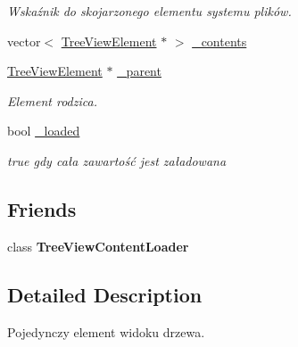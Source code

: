 \begin{DoxyCompactItemize}
\begin{DoxyCompactList}\small\item\em Wskaźnik do skojarzonego elementu systemu plików. \item\end{DoxyCompactList}\item 
vector$<$ \hyperlink{class_tree_view_element}{TreeViewElement} $\ast$ $>$ \hyperlink{class_tree_view_element_aa617b10a5c826119ed53c84bb829aaf5}{\_\-contents}
\item 
\hypertarget{class_tree_view_element_aebc63a226e57b45a351427d51d95552f}{
\hyperlink{class_tree_view_element}{TreeViewElement} $\ast$ \hyperlink{class_tree_view_element_aebc63a226e57b45a351427d51d95552f}{\_\-parent}}
\label{class_tree_view_element_aebc63a226e57b45a351427d51d95552f}

\begin{DoxyCompactList}\small\item\em Element rodzica. \item\end{DoxyCompactList}\item 
\hypertarget{class_tree_view_element_a88aee40fc77e1d5f0c5ca5deb919b303}{
bool \hyperlink{class_tree_view_element_a88aee40fc77e1d5f0c5ca5deb919b303}{\_\-loaded}}
\label{class_tree_view_element_a88aee40fc77e1d5f0c5ca5deb919b303}

\begin{DoxyCompactList}\small\item\em true gdy cała zawartość jest załadowana \item\end{DoxyCompactList}\end{DoxyCompactItemize}
\subsection*{Friends}
\begin{DoxyCompactItemize}
\item 
\hypertarget{class_tree_view_element_a1e116f4ac91d0a1b41d323b0601ca352}{
class {\bfseries TreeViewContentLoader}}
\label{class_tree_view_element_a1e116f4ac91d0a1b41d323b0601ca352}

\end{DoxyCompactItemize}


\subsection{Detailed Description}
Pojedynczy element widoku drzewa. 

